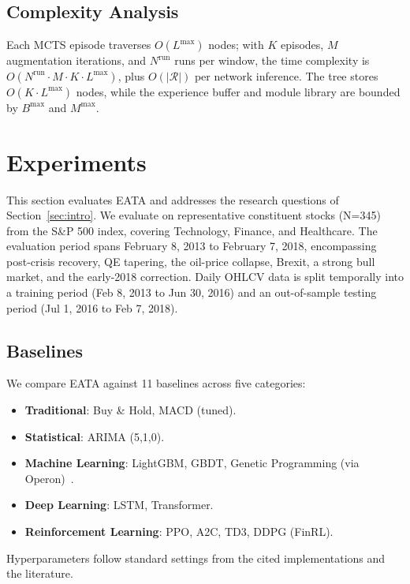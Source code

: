 \documentclass{elektr}
\theoremstyle{corollary}
\theoremstyle{lemma}
\theoremstyle{proposition}
\theoremstyle{axiom}
\theoremstyle{conjecture}
\theoremstyle{example}
\theoremstyle{definition}
\theoremstyle{remark}
\begin{document}
\subsection{Complexity Analysis}
\label{subsec:complexity}

Each MCTS episode traverses $O(L^{\max})$ nodes; with $K$ episodes, $M$ augmentation iterations, and $N^{\text{run}}$ runs per window, the time complexity is $O(N^{\text{run}} \cdot M \cdot K \cdot L^{\max})$, plus $O(|\mathcal{R}|)$ per network inference. The tree stores $O(K \cdot L^{\max})$ nodes, while the experience buffer and module library are bounded by $B^{\max}$ and $M^{\max}$.

\section{Experiments}
\label{sec:experiments}

This section evaluates EATA and addresses the research questions of Section~\ref{sec:intro}. We evaluate on representative constituent stocks (N=345) from the S\&P 500 index, covering Technology, Finance, and Healthcare. The evaluation period spans February 8, 2013 to February 7, 2018, encompassing post-crisis recovery, QE tapering, the oil-price collapse, Brexit, a strong bull market, and the early-2018 correction. Daily OHLCV data is split temporally into a training period (Feb 8, 2013 to Jun 30, 2016) and an out-of-sample testing period (Jul 1, 2016 to Feb 7, 2018).

\subsection{Baselines}
We compare EATA against 11 baselines across five categories:
\begin{itemize}
    \item \textbf{Traditional}: Buy \& Hold, MACD (tuned).
    \item \textbf{Statistical}: ARIMA (5,1,0).
    \item \textbf{Machine Learning}: LightGBM, GBDT, Genetic Programming (via Operon)~\cite{burlacu2020operon}.
    \item \textbf{Deep Learning}: LSTM, Transformer.
    \item \textbf{Reinforcement Learning}: PPO, A2C, TD3, DDPG (FinRL).
\end{itemize}
Hyperparameters follow standard settings from the cited implementations and the literature.
\end{document}
